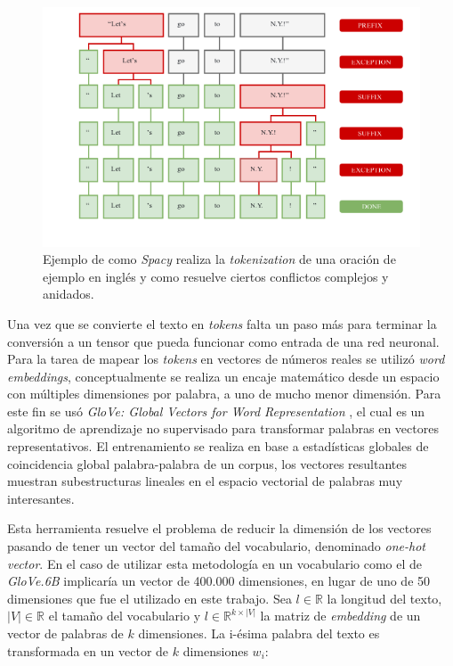 \documentclass[spanish]{article}
\theoremstyle{definition}
\theoremstyle{remark}
\numberwithin{equation}{section}
\numberwithin{equation}{section} %
\begin{document}
\begin{figure}[H]
\centering
\includegraphics[width=14cm]{img/tokenization.png}
\caption[Tokenizer]{\footnotesize{  Ejemplo de como \textit{Spacy} \cite{spacy2} realiza la \textit{tokenization} de una oración de ejemplo en inglés y como resuelve ciertos conflictos complejos y anidados.    }}
\label{fig:tokenizer}
\end{figure}
Una vez que se convierte el texto en \textit{tokens} falta un paso más para terminar la conversión a un tensor que pueda funcionar como entrada de una red neuronal. Para la tarea de mapear los \textit{tokens} en vectores de números reales se utilizó \textit{word embeddings}, conceptualmente  se realiza un encaje matemático desde un espacio con múltiples dimensiones por palabra, a uno de mucho menor dimensión. Para este fin se usó \textit{GloVe: Global Vectors for Word Representation} \cite{pennington2014glove}, el cual es un algoritmo de aprendizaje no supervisado para transformar palabras en vectores representativos. El entrenamiento se realiza en base a estadísticas globales de coincidencia global palabra-palabra de un corpus, los vectores resultantes muestran subestructuras lineales en el espacio vectorial de palabras muy interesantes. 
\par
Esta herramienta resuelve el problema de reducir la dimensión de los vectores pasando de tener un vector del tamaño del vocabulario, denominado \textit{one-hot vector}. En el caso de utilizar esta metodología en un vocabulario como el de \textit{GloVe.6B} implicaría un vector de 400.000 dimensiones, en lugar de uno de 50 dimensiones que fue el utilizado en este trabajo. Sea $l \in \mathbb{R}$ la longitud del texto, $|V| \in \mathbb{R}$ el tamaño del vocabulario y  $l \in \mathbb{R}^{k \times |V|}$ la matriz de \textit{embedding} de un vector de palabras de $k$ dimensiones. La i-ésima palabra del texto es transformada en un vector de $k$ dimensiones $w_i$:
\end{document}
